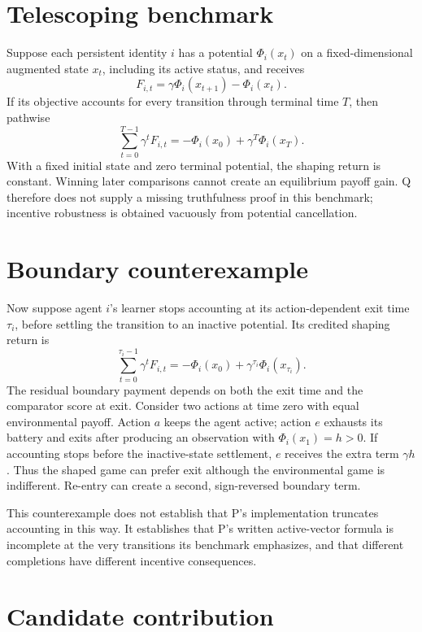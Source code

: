 \documentclass{article}
\begin{document}
\section{Telescoping benchmark}

Suppose each persistent identity \(i\) has a potential \(\Phi_i(x_t)\) on a fixed-dimensional augmented state \(x_t\), including its active status, and receives
\[
F_{i,t}=\gamma\Phi_i(x_{t+1})-\Phi_i(x_t).
\]
If its objective accounts for every transition through terminal time \(T\), then pathwise
\[
\sum_{t=0}^{T-1}\gamma^tF_{i,t}
=-\Phi_i(x_0)+\gamma^T\Phi_i(x_T).
\]
With a fixed initial state and zero terminal potential, the shaping return is constant. Winning later comparisons cannot create an equilibrium payoff gain. Q therefore does not supply a missing truthfulness proof in this benchmark; incentive robustness is obtained vacuously from potential cancellation.

\section{Boundary counterexample}

Now suppose agent \(i\)'s learner stops accounting at its action-dependent exit time \(\tau_i\), before settling the transition to an inactive potential. Its credited shaping return is
\[
\sum_{t=0}^{\tau_i-1}\gamma^tF_{i,t}
=-\Phi_i(x_0)+\gamma^{\tau_i}\Phi_i(x_{\tau_i}).
\]
The residual boundary payment depends on both the exit time and the comparator score at exit. Consider two actions at time zero with equal environmental payoff. Action \(a\) keeps the agent active; action \(e\) exhausts its battery and exits after producing an observation with \(\Phi_i(x_1)=h>0\). If accounting stops before the inactive-state settlement, \(e\) receives the extra term \(\gamma h\). Thus the shaped game can prefer exit although the environmental game is indifferent. Re-entry can create a second, sign-reversed boundary term.

This counterexample does not establish that P's implementation truncates accounting in this way. It establishes that P's written active-vector formula is incomplete at the very transitions its benchmark emphasizes, and that different completions have different incentive consequences.

\section{Candidate contribution}
\end{document}

